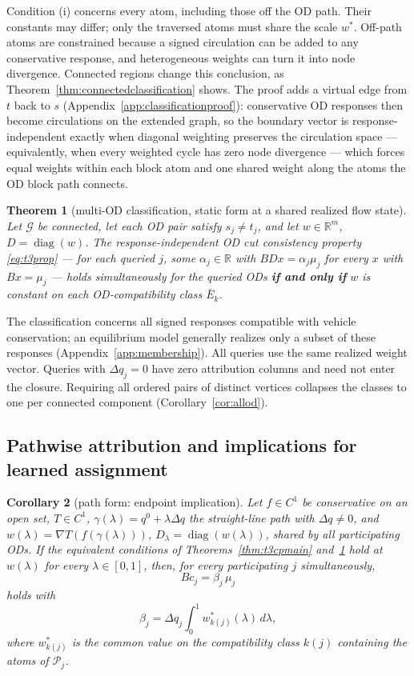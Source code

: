 \documentclass[a4paper,fleqn]{cas-sc}
\newtheorem{theorem}{Theorem}
\newtheorem{corollary}[theorem]{Corollary}
\newcommand{\R}{\mathbb{R}}
\begin{document}
Condition (i) concerns every atom, including those off the OD path. Their
constants may differ; only the traversed atoms must share the scale $w^*$.
Off-path atoms are constrained because a signed circulation can
be added to any conservative response, and heterogeneous weights can turn
it into node divergence. Connected regions change this conclusion, as
Theorem~\ref{thm:connectedclassification} shows. The proof adds a virtual
edge from $t$ back to $s$
(Appendix~\ref{app:classificationproof}): conservative OD responses then
become circulations on the extended graph, so the boundary vector is
response-independent exactly when diagonal weighting preserves the
circulation space --- equivalently, when every weighted cycle has zero
node divergence --- which forces equal weights within each block atom
and one shared weight along the atoms the OD block path connects.

\begin{theorem}[multi-OD classification, static form at a shared
realized flow state]\label{thm:t3cm}
Let $\mathcal{G}$ be connected, let each OD pair satisfy $s_j\ne t_j$,
and let $w\in\R^m$, $D=\operatorname{diag}(w)$. The
response-independent OD cut consistency property \eqref{eq:t3prop}
--- for each queried $j$, some $\alpha_j\in\R$ with
$BDx=\alpha_j\mu_j$ for every $x$ with $Bx=\mu_j$ --- holds
simultaneously for the queried ODs \textbf{if and only if} $w$ is
constant on each OD-compatibility class $\bar{E}_k$.
\end{theorem}

The classification concerns all signed responses compatible with vehicle
conservation; an equilibrium model generally realizes only a subset of
these responses (Appendix~\ref{app:membership}).
All queries use the same realized weight vector. Queries with $\Delta q_j=0$
have zero attribution columns and need not enter the closure. Requiring all
ordered pairs of distinct vertices collapses the classes to one per
connected component (Corollary~\ref{cor:allod}).

\subsection{Pathwise attribution and implications for learned assignment}\label{sec:pathwise}
\begin{corollary}[path form: endpoint implication]\label{cor:path}
Let $f\in C^1$ be conservative on an open set, $T\in C^1$,
$\gamma(\lambda)=q^0+\lambda\Delta q$ the straight-line path with $\Delta q\ne0$, and
$w(\lambda)=\nabla T(f(\gamma(\lambda)))$, $D_\lambda=\operatorname{diag}(w(\lambda))$, shared by
all participating ODs. If the equivalent conditions of
Theorems~\ref{thm:t3cpmain} and~\ref{thm:t3cm} hold at $w(\lambda)$ for
every $\lambda\in[0,1]$, then, for every participating $j$
simultaneously,
\[
Bc_j=\beta_j\,\mu_j
\]
holds with
\[
\beta_j=\Delta q_j\int_0^1 w^*_{k(j)}(\lambda)\,d\lambda,
\]
where $w^*_{k(j)}$
is the common value on the compatibility class $k(j)$ containing the
atoms of $\mathcal{P}_j$.
\end{corollary}
\end{document}
